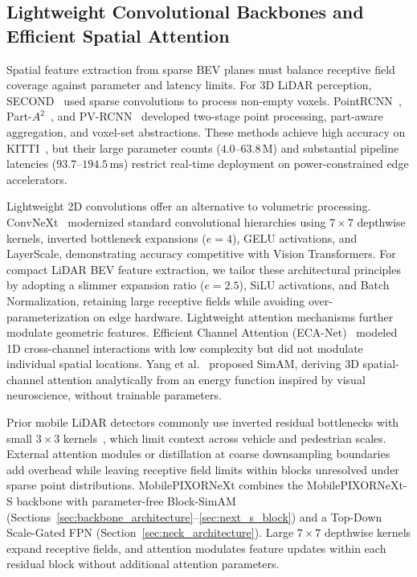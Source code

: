 \subsection{Lightweight Convolutional Backbones and Efficient Spatial Attention}
\label{sec:rel_backbone_attention}

Spatial feature extraction from sparse BEV planes must balance receptive field coverage against parameter and latency limits. For 3D LiDAR perception, SECOND~\cite{yan2018second} used sparse convolutions to process non-empty voxels. PointRCNN~\cite{shi2019pointrcnn}, Part-$A^2$~\cite{shi2020part}, and PV-RCNN~\cite{shi2020pvrcnn} developed two-stage point processing, part-aware aggregation, and voxel-set abstractions. These methods achieve high accuracy on KITTI~\cite{geiger2012kitti}, but their large parameter counts ($4.0\text{--}63.8\,\text{M}$) and substantial pipeline latencies ($93.7\text{--}194.5\,\text{ms}$) restrict real-time deployment on power-constrained edge accelerators.

Lightweight 2D convolutions offer an alternative to volumetric processing. ConvNeXt~\cite{liu2022convnext} modernized standard convolutional hierarchies using $7 \times 7$ depthwise kernels, inverted bottleneck expansions ($e=4$), GELU activations, and LayerScale, demonstrating accuracy competitive with Vision Transformers. For compact LiDAR BEV feature extraction, we tailor these architectural principles by adopting a slimmer expansion ratio ($e=2.5$), SiLU activations, and Batch Normalization, retaining large receptive fields while avoiding over-parameterization on edge hardware. Lightweight attention mechanisms further modulate geometric features. Efficient Channel Attention (ECA-Net)~\cite{wang2020eca} modeled 1D cross-channel interactions with low complexity but did not modulate individual spatial locations. Yang et al.~\cite{yang2021simam} proposed SimAM, deriving 3D spatial-channel attention analytically from an energy function inspired by visual neuroscience, without trainable parameters.

Prior mobile LiDAR detectors commonly use inverted residual bottlenecks with small $3 \times 3$ kernels~\cite{nguyen2024indoor}, which limit context across vehicle and pedestrian scales. External attention modules or distillation at coarse downsampling boundaries~\cite{tran2026rubber} add overhead while leaving receptive field limits within blocks unresolved under sparse point distributions. MobilePIXORNeXt combines the MobilePIXORNeXt-S backbone with parameter-free Block-SimAM (Sections~\ref{sec:backbone_architecture}--\ref{sec:next_s_block}) and a Top-Down Scale-Gated FPN (Section~\ref{sec:neck_architecture}). Large $7 \times 7$ depthwise kernels expand receptive fields, and attention modulates feature updates within each residual block without additional attention parameters.

